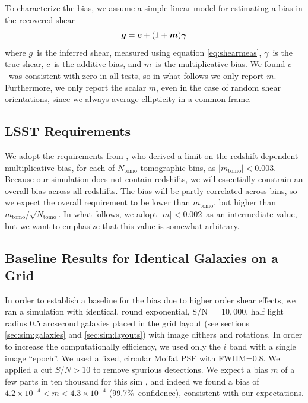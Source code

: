 \documentclass[twocolumn,twocolappendix,astrosym]{openjournal}
\newcommand{\vecg}{\mbox{\boldmath $g$}}
\newcommand{\vecc}{\mbox{\boldmath $c$}}
\newcommand{\vecm}{\mbox{\boldmath $m$}}
\newcommand{\vecgam}{\mbox{\boldmath $\gamma$}}
\newcommand{\mthresh}{0.002}
\begin{document}
To characterize the bias, we assume a simple linear model \citep[see,
e.g.,][]{heymans2006} for estimating a bias in the recovered shear
\begin{equation} \label{eq:m}
\vecg = \vecc + (1 + \vecm) \vecgam
\end{equation}
where \vecg\ is the inferred shear, measured using equation \ref{eq:shearmeas},
\vecgam\ is the true shear, \vecc\ is the additive bias, and \vecm\ is the
multiplicative bias. We found \vecc\ was consistent with zero in all tests, so
in what follows we only report \vecm.  Furthermore, we only report
the scalar $m$, even in the case of random shear orientations, since we
always average ellipticity in a common frame.

\subsection{LSST Requirements} \label{sec:lsstreq}

We adopt the requirements from \cite{SRD}, who derived a limit on the
redshift-dependent multiplicative bias, for each of $N_{\mathrm{tomo}}$
tomographic bins, as $|m_{\mathrm{tomo}}| < 0.003$.  Because our simulation
does not contain redshifts, we will essentially constrain an overall bias
across all redshifts.  The bias will be partly correlated across bins, so we
expect the overall requirement to be lower than $m_{\mathrm{tomo}}$, but higher
than $m_{\mathrm{tomo}}/\sqrt{N_{\mathrm{tomo}}}$.  In what follows, we adopt
$|m| < $\mthresh\ as an intermediate value, but we want to emphasize that this
value is somewhat arbitrary.

\subsection{Baseline Results for Identical Galaxies on a Grid} \label{sec:results:base}

In order to establish a baseline for the bias due to higher order shear
effects, we ran a simulation with identical, round exponential, S/N $= 10,000$,
half light radius 0.5 arcsecond galaxies placed in the grid layout (see
sections \ref{sec:sim:galaxies} and \ref{sec:sim:layouts}) with image dithers
and rotations.  In order to increase the computationally efficiency, we used
only the $i$ band with a single image ``epoch''.  We used a fixed, circular
Moffat PSF\citep{Moffat1969} with FWHM=0.8.  We applied a cut $S/N > 10$ to
remove spurious detections.  We expect a bias $m$ of a few parts in ten
thousand for this sim \citep{SheldonMcal2017}, and indeed we found a bias of
$4.2\times 10^{-4} < m < 4.3\times 10^{-4}$ (99.7\%~confidence), consistent
with our expectations.
\end{document}
